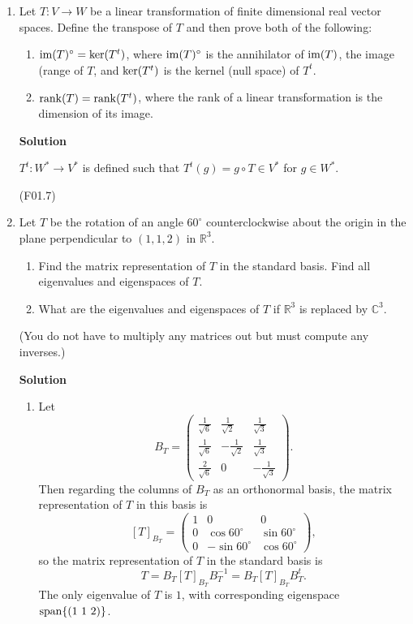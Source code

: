 \documentclass{article}
\def\im{\mathop{\rm im}\nolimits}
\def\ker{\mathop{\rm ker}\nolimits}
\def\rank{\mathop{\rm rank}\nolimits}
\def\span{\mathop{\rm span}\nolimits}
\newcommand{\matrixiiibyiii}[9]{\left( \begin{array}{ccc} #1 & #2 & #3 \\ #4 & #5 & #6 \\ #7 & #8 & #9 \end{array} \right)}
\begin{document}
\begin{enumerate}
{\bf Solution}



\item Let \(T : V \to W\) be a linear transformation of finite dimensional real vector spaces.  Define the transpose of \(T\) and then prove both of the following:

\begin{enumerate}
\item \(\im(T)^{\circ} = \ker(T^t)\), where \(\im(T)^{\circ}\) is the annihilator of \(\im(T)\), the image (range of \(T\), and \(\ker(T^t)\) is the kernel (null space) of \(T^t\).

\item \(\rank(T) = \rank(T^t)\), where the rank of a linear transformation is the dimension of its image.

\end{enumerate}

{\bf Solution}

\(T^t : W^* \to V^*\) is defined such that \(T^t(g) = g \circ T \in V^*\) for \(g \in W^*\).

(F01.7)



\item Let \(T\) be the rotation of an angle \(60^{\circ}\) counterclockwise about the origin in the plane perpendicular to \((1,1,2)\) in \(\mathbb{R}^3\).

\begin{enumerate}
\item Find the matrix representation of \(T\) in the standard basis.  Find all eigenvalues and eigenspaces of \(T\).

\item What are the eigenvalues and eigenspaces of \(T\) if \(\mathbb{R}^3\) is replaced by \(\mathbb{C}^3\).

\end{enumerate}

(You do not have to multiply any matrices out but must compute any inverses.)

{\bf Solution}

\begin{enumerate}
\item Let
\[B_T = \matrixiiibyiii{\frac{1}{\sqrt{6}}}{ \frac{1}{\sqrt{2}}}{ \frac{1}{\sqrt{3}}}
                       {\frac{1}{\sqrt{6}}}{-\frac{1}{\sqrt{2}}}{ \frac{1}{\sqrt{3}}}
                       {\frac{2}{\sqrt{6}}}{                  0}{-\frac{1}{\sqrt{3}}}.\]
Then regarding the columns of \(B_T\) as an orthonormal basis, the matrix representation of \(T\) in this basis is
\[[T]_{B_T} = \matrixiiibyiii{1}{               0}{              0}
                             {0}{ \cos 60^{\circ}}{\sin 60^{\circ}}
                             {0}{-\sin 60^{\circ}}{\cos 60^{\circ}},\]
so the matrix representation of \(T\) in the standard basis is
\[T = B_T [T]_{B_T} B_T^{-1}
    = B_T [T]_{B_T} B_T^t.\]
The only eigenvalue of \(T\) is \(1\), with corresponding eigenspace \(\span \{(1 \ 1 \ 2)\}\).


\end{enumerate}
\end{enumerate}
\end{document}
